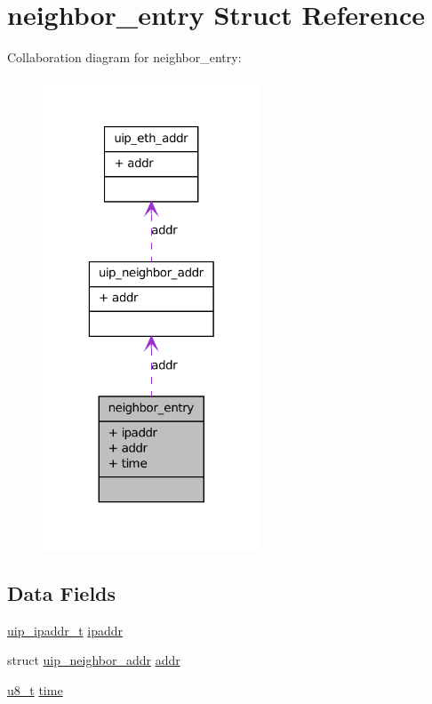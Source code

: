 \hypertarget{structneighbor__entry}{
\section{neighbor\_\-entry Struct Reference}
\label{structneighbor__entry}
}


Collaboration diagram for neighbor\_\-entry:
\nopagebreak
\begin{figure}[H]
\begin{center}
\leavevmode
\includegraphics[width=184pt]{structneighbor__entry__coll__graph}
\end{center}
\end{figure}
\subsection*{Data Fields}
\begin{DoxyCompactItemize}
\item 
\hyperlink{group__uip_ga1ef35301f43a5bbb9f89f07b5a36b9a0}{uip\_\-ipaddr\_\-t} \hyperlink{structneighbor__entry_afaed134859c9ee8763e6961c8ac55917}{ipaddr}
\item 
struct \hyperlink{structuip__neighbor__addr}{uip\_\-neighbor\_\-addr} \hyperlink{structneighbor__entry_a52454396ea069977fa54372f9bbef992}{addr}
\item 
\hyperlink{group__uipfw_ga4caecabca98b43919dd11be1c0d4cd8e}{u8\_\-t} \hyperlink{structneighbor__entry_a0adf1b5aea439695cbd94b348eb4511b}{time}
\end{DoxyCompactItemize}


